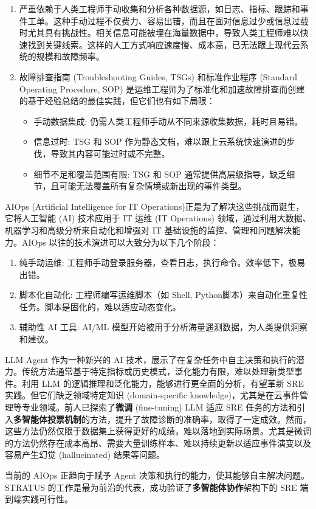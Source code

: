 {    \begin{enumerate}[label=\arabic*)]
    \item{
        严重依赖于人类工程师手动收集和分析各种数据源，如日志、指标、跟踪和事件工单。这种手动过程不仅费力、容易出错，而且在面对信息过少或信息过载时尤其具有挑战性。相关信息可能被埋在海量数据中，导致人类工程师难以快速找到关键线索。这样的人工方式响应速度慢、成本高，已无法跟上现代云系统的规模和故障频率。
    }
    \item{
        故障排查指南 (Troubleshooting Guides, TSGs) 和标准作业程序 (Standard Operating Procedure, SOP) 是运维工程师为了标准化和加速故障排查而创建的基于经验总结的最佳实践，但它们也有如下局限：
        \begin{itemize}
        \item 手动数据集成: 仍需人类工程师手动从不同来源收集数据，耗时且易错。
        \item 信息过时: TSG 和 SOP 作为静态文档，难以跟上云系统快速演进的步伐，导致其内容可能过时或不完整。
        \item 细节不足和覆盖范围有限: TSG 和 SOP 通常提供高层级指导，缺乏细节，且可能无法覆盖所有复杂情境或新出现的事件类型。
        \end{itemize}
    }
    \end{enumerate}
    AIOps (Artificial Intelligence for IT Operations)\proposalRef 正是为了解决这些挑战而诞生，它将人工智能 (AI) 技术应用于 IT 运维 (IT Operations) 领域，通过利用大数据、机器学习和高级分析来自动化和增强对 IT 基础设施的监控、管理和问题解决能力。AIOps 以往的技术演进可以大致分为以下几个阶段：
    \begin{enumerate}[label=\roman*)]
    \item 纯手动运维: 工程师手动登录服务器，查看日志，执行命令。效率低下，极易出错。
    \item 脚本化自动化: 工程师编写运维脚本（如 Shell, Python脚本）来自动化重复性任务。脚本是固化的，难以适应动态变化。
    \item 辅助性 AI 工具: AI/ML 模型开始被用于分析海量遥测数据，为人类提供洞察和建议。
    \end{enumerate}
    LLM Agent 作为一种新兴的 AI 技术，展示了在复杂任务中自主决策和执行的潜力。传统方法通常基于特定指标或历史模式，泛化能力有限，难以处理新类型事件。利用 LLM 的逻辑推理和泛化能力，能够进行更全面的分析，有望革新 SRE 实践。但它们缺乏领域特定知识 (domain-specific knowledge)，尤其是在云事件管理等专业领域。前人已探索了\textbf{微调} (fine-tuning) LLM 适应 SRE 任务的方法\proposalRef 和引入\textbf{多智能体投票机制}的方法\proposalRef，提升了故障诊断的准确率，取得了一定成效。然而，这些方法仍然仅限于数据集上获得更好的成绩，难以落地到实际场景。尤其是微调的方法仍然存在成本高昂、需要大量训练样本、难以持续更新以适应事件演变以及容易产生幻觉 (hallucinated) 结果等问题。

    当前的 AIOps 正趋向于赋予 Agent 决策和执行的能力，使其能够自主解决问题。STRATUS 的工作\proposalRef 是最为前沿的代表，成功验证了\textbf{多智能体协作}架构下的 SRE 端到端实践可行性。
}


